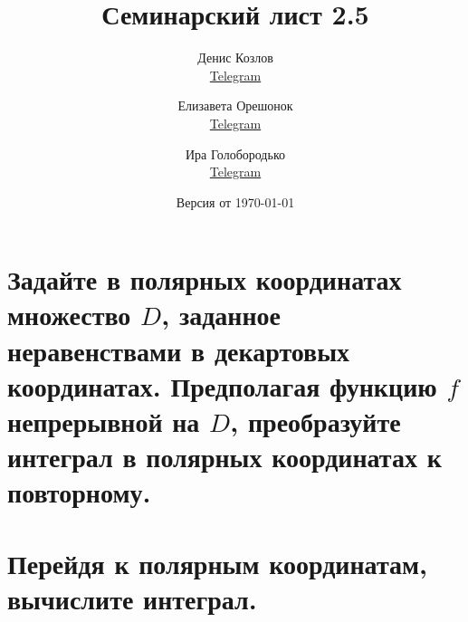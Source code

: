 \documentclass[a4paper, fleqn]{article}
\title{Семинарский лист 2.5}
\author{
    Денис Козлов         \\ \href{https://t.me/DKozl50}{Telegram} \and
    Елизавета Орешонок   \\ \href{https://t.me/eaoresh}{Telegram} \and
    Ира Голобородько     \\ \href{https://t.me/Ira4kgl}{Telegram}
}
\date{Версия от {\ddmmyyyydate\today} \currenttime}
\begin{document}
    \maketitle
    
    \section*{Задайте в полярных координатах множество $D$, заданное неравенствами в декартовых координатах.
    Предполагая функцию $f$ непрерывной на $D$, преобразуйте интеграл в полярных координатах к повторному.}
    
    
    
    
    
    
    \section*{Перейдя к полярным координатам, вычислите интеграл.}
    
\end{document}
